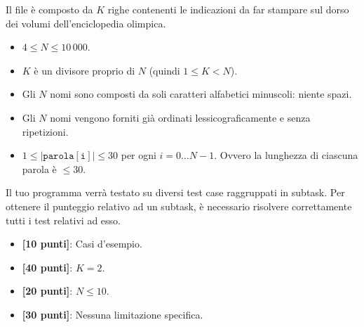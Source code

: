 \OutputFile
Il file \outputfile{} è composto da $K$ righe contenenti le indicazioni da far stampare sul dorso dei volumi dell'enciclopedia olimpica.

\pagebreak

\Constraints
\begin{itemize}[nolistsep, itemsep=2mm]
  \item $4 \le N \le 10\,000$.
  \item $K$ \`e un divisore proprio di $N$ (quindi $1 \le K < N$).
  \item Gli $N$ nomi sono composti da soli caratteri alfabetici minuscoli: niente spazi.
  \item Gli $N$ nomi vengono forniti già ordinati lessicograficamente e senza ripetizioni.
  \item $1 \le |\mathtt{parola[i]}| \le 30$ per ogni $i=0\ldots N-1$. Ovvero la lunghezza di ciascuna parola è $\le 30$.
\end{itemize}

\Scoring
Il tuo programma verrà testato su diversi test case raggruppati in subtask.
Per ottenere il punteggio relativo ad un subtask, è necessario risolvere
correttamente tutti i test relativi ad esso.

\begin{itemize}[nolistsep,itemsep=2mm]
  \item \textbf{ [10 punti]}: Casi d'esempio.
  \item \textbf{ [40 punti]}: $K = 2$.
  \item \textbf{ [20 punti]}: $N \le 10$.
  \item \textbf{ [30 punti]}: Nessuna limitazione specifica.
\end{itemize}



\Examples
\begin{example}
%
%
%
\end{example}
